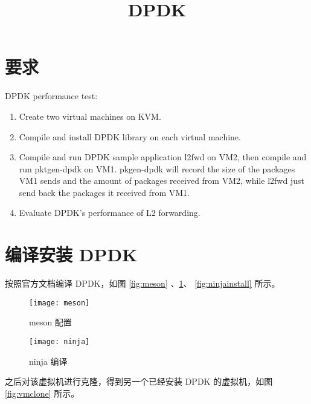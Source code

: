 

    \title{DPDK}
    \maketitle
    \tableofcontents
    \section{要求}

    DPDK performance test:

    \begin{enumerate}[(1)]
        \item Create two virtual machines on KVM.
        \item Compile and install DPDK library on each virtual machine.
        \item Compile and run DPDK sample application l2fwd on VM2, then compile and run pktgen-dpdk on VM1.  pkgen-dpdk will record the size of the packages VM1 sends and the amount of packages received from VM2,  while l2fwd just send back the packages it received from VM1.
        \item Evaluate DPDK's performance of L2 forwarding.
    \end{enumerate}

    \section{编译安装 DPDK}

    按照官方文档\cite{dpdk}编译 DPDK，如图 \ref{fig:meson} 、\ref{fig:ninja}、 \ref{fig:ninjainstall} 所示。


    \begin{figure}[H]
        \centering
        \begin{minipage}{0.48\textwidth}
            \centering
            \texttt{[image: meson]}
            \caption{meson 配置}\label{fig:meson}
        \end{minipage}
        \begin{minipage}{0.48\textwidth}
            \centering
            \texttt{[image: ninja]}
            \caption{ninja 编译}\label{fig:ninja}
        \end{minipage}
    \end{figure}

    之后对该虚拟机进行克隆，得到另一个已经安装 DPDK 的虚拟机，如图 \ref{fig:vmclone} 所示。

